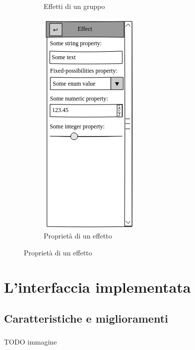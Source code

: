\documentclass[%
]{beamer}
\begin{document}
\begin{frame}
\begin{figure}[htbp]
\begin{subfigure}{.2\textwidth}
                        \caption{Effetti di un gruppo}
                        \label{fig:mock:effects}
                    \end{subfigure}
                    \qquad{\LARGE$\Rightarrow$}\qquad
                    \pause
                    \begin{subfigure}{.2\textwidth}
                        \includegraphics[scale=0.4]{mock/crop/properties}
                        \caption{Proprietà di un effetto}
                        \label{fig:mock:properties}
                    \end{subfigure}
                \end{figure}
            \end{frame}

    \section{L'interfaccia implementata}\label{sec:newgui}
        \subsection{Caratteristiche e miglioramenti}\label{subsec:feature}
            \begin{frame}
                \frametitle{\insertsection}
                \framesubtitle{\insertsubsection}
                \centering \huge TODO immagine%
            \end{frame}
\end{document}
